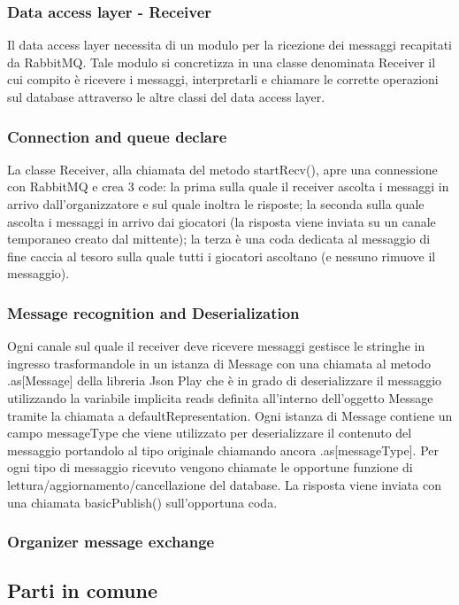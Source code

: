 \documentclass[12pt, italian]{article}
\begin{document}
\subsubsection{Data access layer - Receiver}
Il data access layer necessita di un modulo per la ricezione dei messaggi recapitati da RabbitMQ. Tale modulo si concretizza in una classe denominata Receiver il cui compito è ricevere i messaggi, interpretarli e chiamare le corrette operazioni sul database attraverso le altre classi del data access layer.

\subsubsection*{Connection and queue declare}
La classe Receiver, alla chiamata del metodo startRecv(), apre una connessione con RabbitMQ e crea 3 code:
la prima sulla quale il receiver ascolta i messaggi in arrivo dall'organizzatore e sul quale inoltra le risposte;
la seconda sulla quale ascolta i messaggi in arrivo dai giocatori (la risposta viene inviata su un canale temporaneo creato dal mittente);
la terza è una coda dedicata al messaggio di fine caccia al tesoro sulla quale tutti i giocatori ascoltano (e nessuno rimuove il messaggio).

\subsubsection*{Message recognition and Deserialization}
Ogni canale sul quale il receiver deve ricevere messaggi gestisce le stringhe in ingresso trasformandole in un istanza di Message con una chiamata al metodo .as[Message] della libreria Json Play che è in grado di deserializzare il messaggio utilizzando la variabile implicita reads definita all'interno dell'oggetto Message tramite la chiamata a defaultRepresentation. Ogni istanza di Message contiene un campo messageType che viene utilizzato per deserializzare il contenuto del messaggio portandolo al tipo originale chiamando ancora .as[messageType].
Per ogni tipo di messaggio ricevuto vengono chiamate le opportune funzione di lettura/aggiornamento/cancellazione del database.
La risposta viene inviata con una chiamata basicPublish() sull'opportuna coda.

\subsubsection{Organizer message exchange}
\subsection{Parti in comune}
\end{document}
